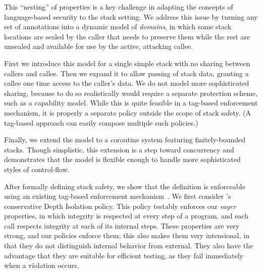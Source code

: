 \documentclass[acmsmall,review,anonymous]{acmart}\settopmatter{printfolios=true,printccs=false,printacmref=false}
\begin{document}
This ``nesting'' of properties is a key challenge in adapting the concepts
of language-based security to the stack setting. We address this issue by
turning any set of annotations into a dynamic model of {\em domains},
in which some stack locations are sealed by the caller that needs to preserve
them while the rest are unsealed and available for use by the active, attacking
callee.

First we introduce this model for a single simple stack with no sharing between callers and
callee. Then we expand it to allow passing of stack data, granting a callee one time
access to the caller's data. We do not model more sophisticated sharing, because to do
so realistically would require a separate protection scheme, such as a capability
model. While this is quite feasible in a tag-based enforcement mechanism, it is properly
a separate policy outside the scope of stack safety. (A tag-based approach can easily
compose multiple such policies.)

Finally, we extend the model to a coroutine system featuring finitely-bounded stacks.
Though simplistic, this extension is a step toward concurrency and demonstrates that
the model is flexible enough to handle more sophisticated styles of control-flow.

After formally defining stack safety, we show that the definition is
enforceable using an existing tag-based enforcement
mechanism~\citep{DBLP:conf/sp/RoesslerD18}. We first consider
\citeauthor{DBLP:conf/sp/RoesslerD18}'s conservative Depth Isolation policy.
This policy testably enforces our {\em eager} properties, in which integrity is respected
at every step of a program, and each call respects integrity at each of its internal steps.
These properties are very strong, and our policies enforce them; this also makes them very
intensional, in that they do not distinguish internal behavior from external.
They also have the advantage that they are suitable for efficient testing, as they
fail immediately when a violation occurs.
\end{document}
